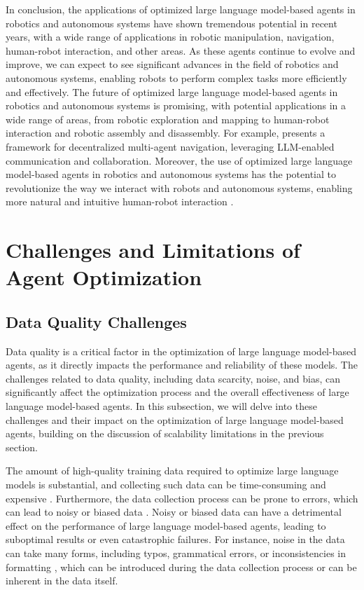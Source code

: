 \documentclass[11pt]{article}
\begin{document}
In conclusion, the applications of optimized large language model-based agents in robotics and autonomous systems have shown tremendous potential in recent years, with a wide range of applications in robotic manipulation, navigation, human-robot interaction, and other areas. As these agents continue to evolve and improve, we can expect to see significant advances in the field of robotics and autonomous systems, enabling robots to perform complex tasks more efficiently and effectively. The future of optimized large language model-based agents in robotics and autonomous systems is promising, with potential applications in a wide range of areas, from robotic exploration and mapping to human-robot interaction and robotic assembly and disassembly. For example, \cite{ref244} presents a framework for decentralized multi-agent navigation, leveraging LLM-enabled communication and collaboration. Moreover, the use of optimized large language model-based agents in robotics and autonomous systems has the potential to revolutionize the way we interact with robots and autonomous systems, enabling more natural and intuitive human-robot interaction \cite{ref245}.

\section{Challenges and Limitations of Agent Optimization}

\subsection{Data Quality Challenges}

Data quality is a critical factor in the optimization of large language model-based agents, as it directly impacts the performance and reliability of these models. The challenges related to data quality, including data scarcity, noise, and bias, can significantly affect the optimization process and the overall effectiveness of large language model-based agents. In this subsection, we will delve into these challenges and their impact on the optimization of large language model-based agents, building on the discussion of scalability limitations in the previous section.

The amount of high-quality training data required to optimize large language models is substantial, and collecting such data can be time-consuming and expensive \cite{ref246}. Furthermore, the data collection process can be prone to errors, which can lead to noisy or biased data \cite{ref35}. Noisy or biased data can have a detrimental effect on the performance of large language model-based agents, leading to suboptimal results or even catastrophic failures. For instance, noise in the data can take many forms, including typos, grammatical errors, or inconsistencies in formatting \cite{ref53}, which can be introduced during the data collection process or can be inherent in the data itself.
\end{document}
